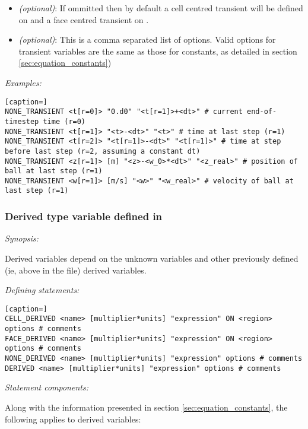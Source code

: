 \begin{itemize}
%
\item {} \emph{(optional)}:  If ommitted then by default a cell centred transient will be defined on  and a face centred transient on .
\item {} \emph{(optional)}:  This is a comma separated list of options.  Valid options for transient variables are the same as those for constants, as detailed in section \ref{sec:equation_constants})
\end{itemize}

\emph{Examples:}

\begin{lstlisting}[caption=]
NONE_TRANSIENT <t[r=0]> "0.d0" "<t[r=1]>+<dt>" # current end-of-timestep time (r=0)
NONE_TRANSIENT <t[r=1]> "<t>-<dt>" "<t>" # time at last step (r=1)
NONE_TRANSIENT <t[r=2]> "<t[r=1]>-<dt>" "<t[r=1]>" # time at step before last step (r=2, assuming a constant dt)
NONE_TRANSIENT <z[r=1]> [m] "<z>-<w_0>*<dt>" "<z_real>" # position of ball at last step (r=1)
NONE_TRANSIENT <w[r=1]> [m/s] "<w>" "<w_real>" # velocity of ball at last step (r=1)
\end{lstlisting}

\subsubsection{Derived type variable defined in  \label{sec:equation_deriveds}}

\emph{Synopsis:}

Derived variables depend on the unknown variables and other previously defined (ie, above in the file) derived variables.

\emph{Defining statements:}

\begin{lstlisting}[caption=]
CELL_DERIVED <name> [multiplier*units] "expression" ON <region> options # comments
FACE_DERIVED <name> [multiplier*units] "expression" ON <region> options # comments
NONE_DERIVED <name> [multiplier*units] "expression" options # comments
DERIVED <name> [multiplier*units] "expression" options # comments
\end{lstlisting}

\emph{Statement components:}

Along with the information presented in section \ref{sec:equation_constants}, the following applies to derived variables:

